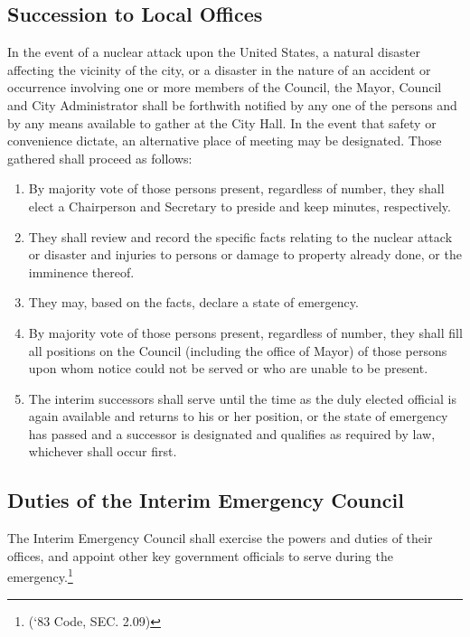 \subsection{Succession to Local Offices}
In the event of a nuclear attack upon the United States, a natural disaster affecting the vicinity of the city, or a disaster in the nature of an accident or occurrence involving one or more members of the Council, the Mayor, Council and City Administrator shall be forthwith notified by any one of the persons and by any means available to gather at the City Hall.  In the event that safety or convenience dictate, an alternative place of meeting may be designated.  Those gathered shall proceed as follows:
\begin{enumerate}
    \item By majority vote of those persons present, regardless of number, they shall elect a Chairperson and Secretary to preside and keep minutes, respectively.
    \item They shall review and record the specific facts relating to the nuclear attack or disaster and injuries to persons or damage to property already done, or the imminence thereof.
    \item They may, based on the facts, declare a state of emergency.
    \item By majority vote of those persons present, regardless of number, they shall fill all positions on the Council (including the office of Mayor) of those persons upon whom notice could not be served or who are unable to be present.
    \item The interim successors shall serve until the time as the duly elected official is again available and returns to his or her position, or the state of emergency has passed and a successor is designated and qualifies as required by law, whichever shall occur first.
\end{enumerate}
\subsection{Duties of the Interim Emergency Council}
The Interim Emergency Council shall exercise the powers and duties of their offices, and appoint other key government officials to serve during the emergency.\footnote{(‘83 Code, SEC. 2.09)}
